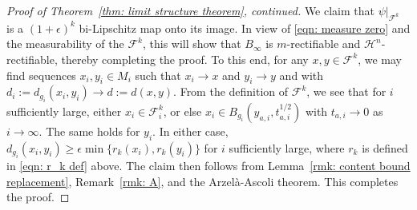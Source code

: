 \documentclass[11pt,reqno]{amsart}
\theoremstyle{remark}
\theoremstyle{definition}
\numberwithin{equation}{section}
\newcommand{\F}{{\mathcal{F}}}
\newcommand{\e}{{\epsilon}}
\newcommand{\Hi}{{\mathcal{H}}}
\begin{document}
\begin{proof}[Proof of Theorem~\ref{thm: limit structure theorem}, continued]
We claim that $\psi|_{\F^k}$ is a $(1+\e)^k$ bi-Lipschitz map onto its image. 
In view of \eqref{eqn: measure zero} and the measurability of the $\F^k$, this will show that $B_\infty$ is $m$-rectifiable and $\Hi^n$-rectifiable, thereby completing the proof.
 To this end, for any $x,y \in \F^k$, we may find sequences $x_i,y_i \in M_i$ such that $x_i\to x$ and  $y_i\to y$ and with $d_i:= d_{g_i}(x_i,y_i)\to d:=d(x,y)$. 
 From the definition of $\F^k$, we see that for $i$ sufficiently large, either $x_i \in \F^k_i$, or else $x_i \in B_{g_i}(y_{a,i}, t_{a,i}^{1/2})$ with $t_{a,i}\to 0$ as $i\to\infty$. The same holds for $y_i$. In either case, $d_{g_i}(x_i,y_i) \geq \e \min\{ r_k(x_i),r_k(y_i)\}$ for $i$ sufficiently large, where $r_k$ is defined in \eqref{eqn: r_k def} above. The claim then follows from Lemma~\ref{rmk: content bound replacement}, Remark~\ref{rmk: A}, and the Arzel\`{a}-Ascoli  theorem. This completes the proof.
 \end{proof}




\end{document}
